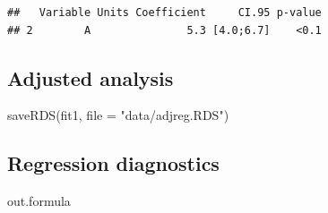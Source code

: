 \documentclass[
]{book}
\newenvironment{Shaded}{\begin{snugshade}}{\end{snugshade}}
\newcommand{\AttributeTok}[1]{\textcolor[rgb]{0.77,0.63,0.00}{#1}}
\newcommand{\CommentTok}[1]{\textcolor[rgb]{0.56,0.35,0.01}{\textit{#1}}}
\newcommand{\DecValTok}[1]{\textcolor[rgb]{0.00,0.00,0.81}{#1}}
\newcommand{\FunctionTok}[1]{\textcolor[rgb]{0.00,0.00,0.00}{#1}}
\newcommand{\NormalTok}[1]{#1}
\newcommand{\OtherTok}[1]{\textcolor[rgb]{0.56,0.35,0.01}{#1}}
\newcommand{\SpecialCharTok}[1]{\textcolor[rgb]{0.00,0.00,0.00}{#1}}
\newcommand{\StringTok}[1]{\textcolor[rgb]{0.31,0.60,0.02}{#1}}
\begin{document}
\begin{verbatim}
##   Variable Units Coefficient     CI.95 p-value
## 2        A               5.3 [4.0;6.7]    <0.1
\end{verbatim}

\hypertarget{adjusted-analysis}{%
\subsection{Adjusted analysis}\label{adjusted-analysis}}

\begin{Shaded}
\end{Shaded}

\begin{Shaded}
\begin{Highlighting}[]
\FunctionTok{saveRDS}\NormalTok{(fit1, }\AttributeTok{file =} \StringTok{"data/adjreg.RDS"}\NormalTok{)}
\end{Highlighting}
\end{Shaded}

\hypertarget{regression-diagnostics}{%
\subsection{Regression diagnostics}\label{regression-diagnostics}}

\begin{Shaded}
\begin{Highlighting}[]
\NormalTok{out.formula}
\end{Highlighting}
\end{Shaded}
\end{document}
